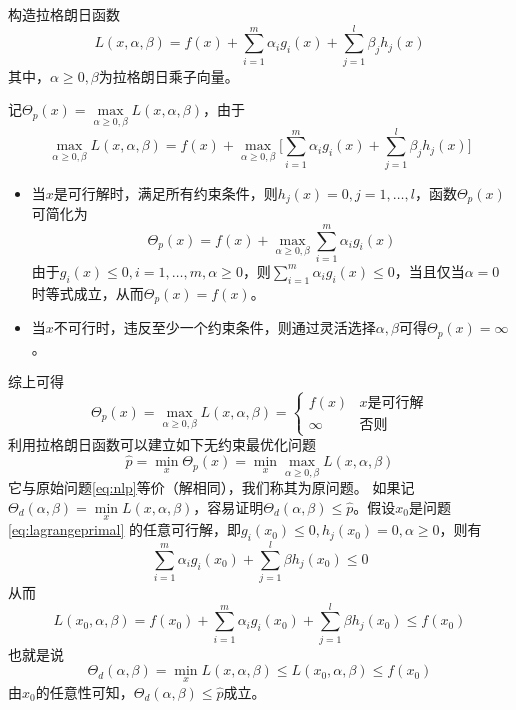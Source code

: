 构造拉格朗日函数
\begin{equation}
    L(x,\alpha,\beta) = f(x) + \sum\limits_{i=1}^m \alpha_i g_i(x) + \sum\limits_{j=1}^l \beta_j h_j(x)
\end{equation}
其中，$\alpha\ge 0,\beta$为拉格朗日乘子向量。

记$\Theta_p(x) = \max\limits_{\alpha \ge 0,\beta} L(x,\alpha,\beta)$，由于
\begin{equation}
   \max\limits_{\alpha \ge 0,\beta} L(x,\alpha,\beta) =  f(x) + \max\limits_{\alpha \ge 0,\beta} \bigg[\sum\limits_{i=1}^m \alpha_i g_i(x) + \sum\limits_{j=1}^l \beta_j h_j(x) \bigg]
\end{equation}
\begin{itemize}
  \item 当$x$是可行解时，满足所有约束条件，则$h_j(x)=0,j=1,\ldots,l$，函数$\Theta_p(x)$可简化为
  \[
    \Theta_p(x) = f(x) + \max\limits_{\alpha \ge 0,\beta} \sum\limits_{i=1}^m \alpha_i g_i(x)
  \]
  由于$g_i(x)\le 0,i=1,\ldots,m,\alpha \ge 0$，则$\sum\limits_{i=1}^m \alpha_i g_i(x) \le 0$，当且仅当$\alpha=0$时等式成立，从而$\Theta_p(x) = f(x)$。
  \item 当$x$不可行时，违反至少一个约束条件，则通过灵活选择$\alpha,\beta$可得$\Theta_p(x)=\infty$。
\end{itemize}
综上可得
\begin{equation}
    \Theta_p(x) = \max\limits_{\alpha \ge 0,\beta} L(x,\alpha,\beta) = \left\{
        \begin{array}{lll}
          f(x) & x\text{是可行解} \\
          \infty & \text{否则}
        \end{array}
    \right.
\end{equation}
利用拉格朗日函数可以建立如下无约束最优化问题
\begin{equation}\label{eq:lagrangeprimal}
    \hat p = \min\limits_x \Theta_p(x) = \min\limits_x \max\limits_{\alpha\ge 0,\beta} L(x,\alpha,\beta)
\end{equation}
它与原始问题\eqref{eq:nlp}等价（解相同），我们称其为原问题。
如果记$\Theta_d(\alpha,\beta) = \min\limits_x L(x,\alpha,\beta)$，容易证明$\Theta_d(\alpha,\beta) \le \hat p$。假设$x_0$是问题\eqref{eq:lagrangeprimal} 的任意可行解，即$g_i(x_0)\le 0, h_j(x_0)=0, \alpha \ge 0$，则有
\begin{equation}
    \sum\limits_{i=1}^m \alpha_i g_i(x_0) + \sum\limits_{j=1}^l \beta h_j(x_0) \le 0
\end{equation}
从而
\begin{equation}
    L(x_0,\alpha,\beta) = f(x_0) + \sum\limits_{i=1}^m \alpha_i g_i(x_0) + \sum\limits_{j=1}^l \beta h_j(x_0) \le f(x_0)
\end{equation}
也就是说
\begin{equation}
    \Theta_d(\alpha,\beta)= \min\limits_x L(x,\alpha,\beta) \le L(x_0,\alpha,\beta) \le f(x_0)
\end{equation}
由$x_0$的任意性可知，$\Theta_d(\alpha,\beta) \le \hat p$成立。

